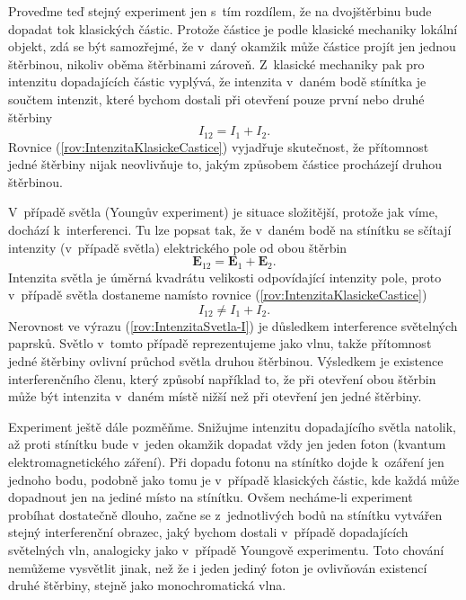 Proveďme teď stejný experiment jen s~tím rozdílem, že na dvojštěrbinu bude dopadat tok klasických částic. Protože částice je podle klasické mechaniky lokální objekt, zdá se být samozřejmé, že v~daný okamžik může částice projít jen jednou štěrbinou, nikoliv oběma štěrbinami zároveň. Z~klasické mechaniky pak pro intenzitu dopadajících částic vyplývá, že intenzita v~daném bodě stínítka je součtem intenzit, které bychom dostali při otevření pouze první nebo druhé štěrbiny
\begin{equation}
I_{12} = I_1 + I_2 \mbox{.}
\label{rov:IntenzitaKlasickeCastice}
\end{equation}
Rovnice (\ref{rov:IntenzitaKlasickeCastice}) vyjadřuje skutečnost, že přítomnost jedné štěrbiny nijak neovlivňuje to, jakým způsobem částice procházejí druhou štěrbinou.

V~případě světla (Youngův experiment) je situace složitější, protože jak víme, dochází k~interferenci. Tu lze popsat tak, že v~daném bodě na stínítku  se sčítají intenzity (v~případě světla) elektrického pole od obou štěrbin
\begin{equation}
\mathbf{E}_{12} = \mathbf{E}_1 + \mathbf{E}_2 \mbox{.}
\label{rov:IntenzitaSvetla-E}
\end{equation}
Intenzita světla je úměrná kvadrátu velikosti odpovídající intenzity pole, proto v~případě světla dostaneme namísto rovnice (\ref{rov:IntenzitaKlasickeCastice})
\begin{equation}
I_{12} \not = I_1 + I_2 \mbox{.}
\label{rov:IntenzitaSvetla-I}
\end{equation}
Nerovnost ve výrazu (\ref{rov:IntenzitaSvetla-I}) je důsledkem interference světelných paprsků. Světlo v~tomto případě reprezentujeme jako vlnu, takže přítomnost jedné štěrbiny ovlivní průchod světla druhou štěrbinou. Výsledkem je existence interferenčního členu, který způsobí například to, že při otevření obou štěrbin může být intenzita v~daném místě nižší než při otevření jen jedné štěrbiny.

Experiment ještě dále pozměňme. Snižujme intenzitu dopadajícího světla natolik, až proti stínítku bude v~jeden okamžik dopadat vždy jen jeden foton (kvantum elektromagnetického záření). Při dopadu fotonu na stínítko dojde k~ozáření jen jednoho bodu, podobně jako tomu je v~případě klasických částic, kde každá může dopadnout jen na jediné místo na stínítku. Ovšem necháme-li experiment probíhat dostatečně dlouho, začne se z~jednotlivých bodů na stínítku vytvářen stejný interferenční obrazec, jaký bychom dostali v~případě dopadajících světelných vln, analogicky jako v~případě Youngově experimentu. Toto chování nemůžeme vysvětlit jinak, než že i jeden jediný foton je ovlivňován existencí druhé štěrbiny, stejně jako monochromatická vlna.

